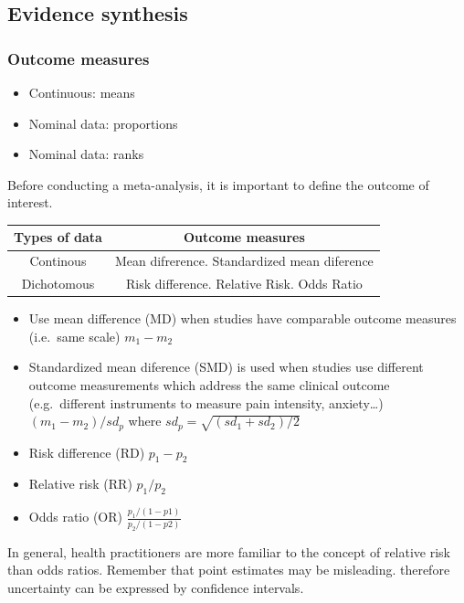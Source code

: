 \documentclass[
]{book}
\providecommand{\tightlist}{%
  \setlength{\itemsep}{0pt}\setlength{\parskip}{0pt}}
\begin{document}
\hypertarget{evidence-synthesis}{%
\subsection{Evidence synthesis}\label{evidence-synthesis}}

\hypertarget{outcome-measures}{%
\subsubsection{Outcome measures}\label{outcome-measures}}

\begin{itemize}
\tightlist
\item
  Continuous: means
\item
  Nominal data: proportions
\item
  Nominal data: ranks
\end{itemize}

Before conducting a meta-analysis, it is important to define the outcome of interest.

\begin{longtable}[]{@{}cc@{}}
\toprule
Types of data & Outcome measures \\
\midrule
\endhead
Continous & Mean difrerence. Standardized mean diference \\
Dichotomous & Risk difference. Relative Risk. Odds Ratio \\
\bottomrule
\end{longtable}

\begin{itemize}
\tightlist
\item
  Use mean difference (MD) when studies have comparable outcome measures (i.e.~same scale) \(m_1 -m_2\)
\item
  Standardized mean diference (SMD) is used when studies use different outcome measurements which address the same clinical outcome (e.g.~different instruments to measure pain intensity, anxiety\ldots) \((m_1 -m_2)/sd_p\) where \(sd_p= \sqrt{(sd_1+sd_2)/2}\)
\item
  Risk difference (RD) \(p_1 - p_2\)
\item
  Relative risk (RR) \(p_1/p_2\)
\item
  Odds ratio (OR) \(\frac{p_1/(1-p1)}{p_2/(1-p2)}\)
\end{itemize}

In general, health practitioners are more familiar to the concept of relative risk than odds ratios. Remember that point estimates may be misleading. therefore uncertainty can be expressed by confidence intervals.
\end{document}
